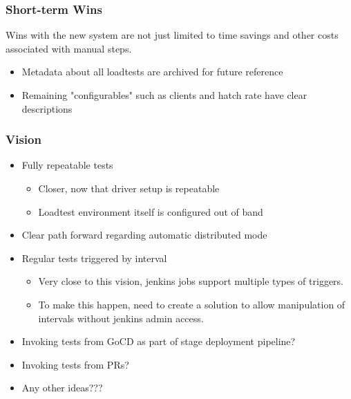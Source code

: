 \documentclass{beamer}
\begin{document}
\begin{frame}
\frametitle{Short-term Wins}

\pause
Wins with the new system are not just limited to time savings and other costs
associated with manual steps.

\begin{itemize}
\item Metadata about all loadtests are archived for future reference
\item Remaining "configurables" such as clients and hatch rate have clear descriptions 
\end{itemize}
\end{frame}

\begin{frame}
\frametitle{Vision}
\begin{itemize}
\pause
\item Fully repeatable tests
    \begin{itemize}
    \item Closer, now that driver setup is repeatable
    \item Loadtest environment itself is configured out of band
    \end{itemize}\pause
\item Clear path forward regarding automatic distributed mode\pause
\item Regular tests triggered by interval
    \begin{itemize}
    \item Very close to this vision, jenkins jobs support multiple types of
          triggers.
    \item To make this happen, need to create a solution to allow manipulation
          of intervals without jenkins admin access.
    \end{itemize}\pause
\item Invoking tests from GoCD as part of stage deployment pipeline?\pause
\item Invoking tests from PRs?\pause
\item Any other ideas???
\end{itemize}
\end{frame}
\end{document}
